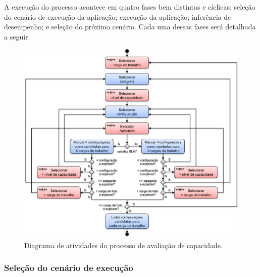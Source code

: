 \documentclass[12pt]{article}
\begin{document}
A execução do processo acontece em quatro fases bem distintas e cíclicas: seleção do cenário de execução da aplicação; execução da aplicação; inferência de desempenho; e seleção do próximo cenário. Cada uma dessas fases será detalhada a seguir.


\begin{figure}[t]
  \begin{center}
    \includegraphics[trim = 20mm 6mm 20mm 5mm, scale=.65]{img/capacity-planning-diagram-v13-1-color-por}
  \end{center}
  \caption{\label{fig:fig_processo_aval_capacidade}Diagrama de atividades do processo de avaliação de capacidade.}
\end{figure}



\subsubsection{Seleção do cenário de execução}
\end{document}

